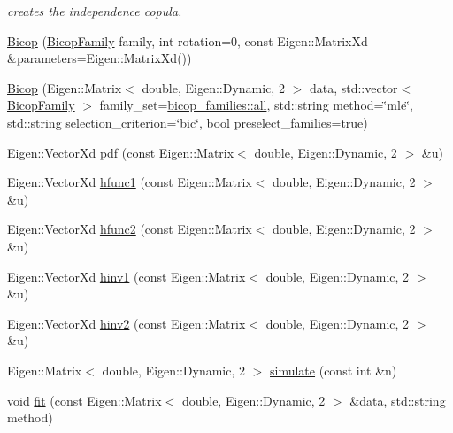 \begin{DoxyCompactItemize}
\begin{DoxyCompactList}\small\item\em creates the independence copula. \end{DoxyCompactList}\item 
\hyperlink{classvinecopulib_1_1_bicop_ab27f789e001e30f2fed7f9ecefdeffb0}{Bicop} (\hyperlink{namespacevinecopulib_a42e95cc06d33896199caab0c11ad44f3}{Bicop\+Family} family, int rotation=0, const Eigen\+::\+Matrix\+Xd \&parameters=Eigen\+::\+Matrix\+Xd())
\item 
\hyperlink{classvinecopulib_1_1_bicop_a87d5c10cb7b6a9c07dc3b2a38da91ee5}{Bicop} (Eigen\+::\+Matrix$<$ double, Eigen\+::\+Dynamic, 2 $>$ data, std\+::vector$<$ \hyperlink{namespacevinecopulib_a42e95cc06d33896199caab0c11ad44f3}{Bicop\+Family} $>$ family\+\_\+set=\hyperlink{namespacevinecopulib_1_1bicop__families_a5214a513f41ec23b74782aab96ea6774}{bicop\+\_\+families\+::all}, std\+::string method=\char`\"{}mle\char`\"{}, std\+::string selection\+\_\+criterion=\char`\"{}bic\char`\"{}, bool preselect\+\_\+families=true)
\item 
Eigen\+::\+Vector\+Xd \hyperlink{classvinecopulib_1_1_bicop_a83dc7214e4bb1bfe59285ca05407d646}{pdf} (const Eigen\+::\+Matrix$<$ double, Eigen\+::\+Dynamic, 2 $>$ \&u)
\item 
Eigen\+::\+Vector\+Xd \hyperlink{classvinecopulib_1_1_bicop_a130fda62cd61c7acdef5db75fffdd89e}{hfunc1} (const Eigen\+::\+Matrix$<$ double, Eigen\+::\+Dynamic, 2 $>$ \&u)
\item 
Eigen\+::\+Vector\+Xd \hyperlink{classvinecopulib_1_1_bicop_a4c9b50f99797ec374f5057cc54db2bd8}{hfunc2} (const Eigen\+::\+Matrix$<$ double, Eigen\+::\+Dynamic, 2 $>$ \&u)
\item 
Eigen\+::\+Vector\+Xd \hyperlink{classvinecopulib_1_1_bicop_a3cc8b161ec6efdb3b34d2efa9185bf44}{hinv1} (const Eigen\+::\+Matrix$<$ double, Eigen\+::\+Dynamic, 2 $>$ \&u)
\item 
Eigen\+::\+Vector\+Xd \hyperlink{classvinecopulib_1_1_bicop_a3e33ec227b6b7182e327399201cad382}{hinv2} (const Eigen\+::\+Matrix$<$ double, Eigen\+::\+Dynamic, 2 $>$ \&u)
\item 
Eigen\+::\+Matrix$<$ double, Eigen\+::\+Dynamic, 2 $>$ \hyperlink{classvinecopulib_1_1_bicop_aeb87bea4283dacfa5e609356c020f85d}{simulate} (const int \&n)
\item 
void \hyperlink{classvinecopulib_1_1_bicop_a266fa8d13e8ed1e96937e4208a99955d}{fit} (const Eigen\+::\+Matrix$<$ double, Eigen\+::\+Dynamic, 2 $>$ \&data, std\+::string method)
\item 

\end{DoxyCompactItemize}

